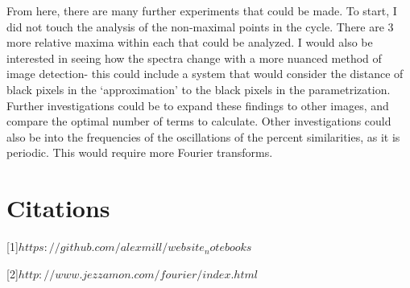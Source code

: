 \documentclass[psamsfonts]{amsart}
\theoremstyle{definition}
\theoremstyle{remark}
\numberwithin{equation}{section}
\begin{document}
From here, there are many further experiments that could be made. To start, I did not touch the analysis of the non-maximal points in the cycle. There are 3 more relative maxima within each that could be analyzed. I would also be interested in seeing how the spectra change with a more nuanced method of image detection- this could include a system that would consider the distance of black pixels in the `approximation' to the black pixels in the parametrization. Further investigations could be to expand these findings to other images, and compare the optimal number of terms to calculate. Other investigations could also be into the frequencies of the oscillations of the percent similarities, as it is periodic. This would require more Fourier transforms. 



\section{Citations}
[1]$https://github.com/alexmill/website_notebooks$

[2]$http://www.jezzamon.com/fourier/index.html$
\end{document}
